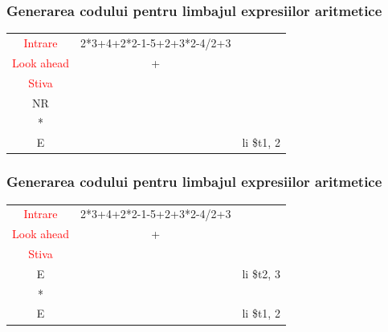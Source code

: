 \documentclass[pdf]{beamer}
\begin{document}
\begin{frame}
\frametitle{Generarea codului pentru limbajul expresiilor aritmetice}
\begin{center}
\begin{tabular}{cc|c|} \cline{1-2}
\multicolumn{1}{|c|}{\textcolor{red}{Intrare}} & {2*3+4+2*2-1-5+2+3*2-4/2+3} \\ \cline{1-2}
\multicolumn{1}{|c|}{\textcolor{red}{Look ahead}} & + \\ \cline{1-2}
\multicolumn{1}{|c|}{\textcolor{red}{Stiva}}  \\
\cline{1-1} \cline{3-3}
\multicolumn{1}{|c|}{NR} & & {}\\
\cline{1-1} \cline{3-3} 
\multicolumn{1}{|c|}{*} & & {}\\
\cline{1-1} \cline{3-3}
\multicolumn{1}{|c|}{E} & & {li \quad \$t1, 2}\\
\cline{1-1} \cline{3-3}
\end{tabular}
\end{center}
\end{frame}



\begin{frame}
\frametitle{Generarea codului pentru limbajul expresiilor aritmetice}
\begin{center}
\begin{tabular}{cc|c|} \cline{1-2}
\multicolumn{1}{|c|}{\textcolor{red}{Intrare}} & {2*3+4+2*2-1-5+2+3*2-4/2+3} \\ \cline{1-2}
\multicolumn{1}{|c|}{\textcolor{red}{Look ahead}} & + \\ \cline{1-2}
\multicolumn{1}{|c|}{\textcolor{red}{Stiva}}  \\
\cline{1-1} \cline{3-3}
\multicolumn{1}{|c|}{E} & & {li \quad \$t2, 3}\\
\cline{1-1} \cline{3-3} 
\multicolumn{1}{|c|}{*} & & {}\\
\cline{1-1} \cline{3-3}
\multicolumn{1}{|c|}{E} & & {li \quad \$t1, 2}\\
\cline{1-1} \cline{3-3}
\end{tabular}
\end{center}
\end{frame}
\end{document}
